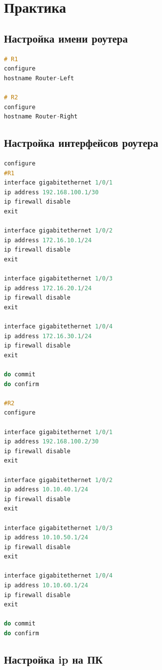 \chapter{Практика}



\section{Настройка имени роутера}

\begin{lstlisting}[language=C, caption={Пример настройки имени роутера}]
# R1
configure
hostname Router-Left

# R2
configure
hostname Router-Right
\end{lstlisting}

\section{Настройка интерфейсов роутера}

\begin{lstlisting}[language=C, caption={Пример настройки интерфейсов роутера}]
configure
#R1
interface gigabitethernet 1/0/1
ip address 192.168.100.1/30
ip firewall disable
exit

interface gigabitethernet 1/0/2
ip address 172.16.10.1/24
ip firewall disable
exit

interface gigabitethernet 1/0/3
ip address 172.16.20.1/24
ip firewall disable
exit

interface gigabitethernet 1/0/4
ip address 172.16.30.1/24
ip firewall disable
exit

do commit
do confirm

#R2
configure

interface gigabitethernet 1/0/1
ip address 192.168.100.2/30
ip firewall disable
exit

interface gigabitethernet 1/0/2
ip address 10.10.40.1/24
ip firewall disable
exit

interface gigabitethernet 1/0/3
ip address 10.10.50.1/24
ip firewall disable
exit

interface gigabitethernet 1/0/4
ip address 10.10.60.1/24
ip firewall disable
exit

do commit
do confirm
\end{lstlisting}

\section{Настройка ip на ПК}

